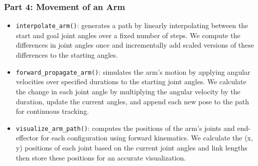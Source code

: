 \documentclass{article}
\begin{document}
\begin{itemize}
\end{itemize}

\subsubsection*{Part 4: Movement of an Arm}

\begin{itemize}
    \item \texttt{interpolate\_arm()}: generates a path by linearly interpolating between the start and goal joint angles over a fixed number of steps. We compute the differences in joint angles once and incrementally add scaled versions of these differences to the starting angles.
    \item \texttt{forward\_propagate\_arm()}: simulates the arm's motion by applying angular velocities over specified durations to the starting joint angles. We calculate the change in each joint angle by multiplying the angular velocity by the duration, update the current angles, and append each new pose to the path for continuous tracking.
    \item \texttt{visualize\_arm\_path()}: computes the positions of the arm's joints and end-effector for each configuration using forward kinematics. We calculate the (x, y) positions of each joint based on the current joint angles and link lengths then store these positions for an accurate visualization.
\end{itemize}
\end{document}
